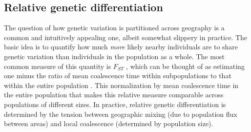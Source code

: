 \documentclass{ar-1col}
\newcommand{\todo}[1]{{\textbf{\color{red}{#1}}}}
\begin{document}
\todo{tidy and conclude}



\subsection{Relative genetic differentiation}

The question of how genetic variation is partitioned across
geography is a common and intuitively appealing one,
albeit somewhat slippery in practice.
The basic idea is to quantify 
how much \emph{more} likely nearby individuals are 
to share genetic variation than individuals in the population as a whole.
The most common measure of this quantity is $F_{ST}$ \citep{Wright1951},
which can be thought of as estimating
one minus the ratio of mean coalescence time within subpopulations
to that within the entire population \citep{slatkin_1991inbreeding}.
This normalization by mean coalescence time in the entire population
that makes this relative measure comparable across populations of different sizes.
In practice, 
relative genetic differentiation is determined by the tension between 
geographic mixing (due to population flux between areas)
and local coalescence (determined by population size).
\end{document}

